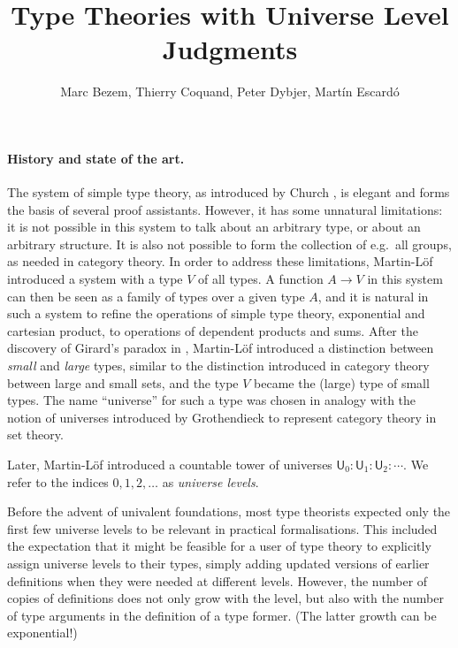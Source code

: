 \documentclass[11pt,a4paper]{article}
\theoremstyle{definition}
\def\UU{\mathsf{U}}
\begin{document}
\title{Type Theories with Universe Level Judgments}

\author{Marc Bezem, Thierry Coquand, Peter Dybjer, Mart\'in Escard\'o}
\date{}
\maketitle


\section*{}\label{sec:intros}
\newcommand{\ttt}[1]{\text{\tt #1}}

\paragraph{History and state of the art.} 
The system of simple type theory, as introduced by Church \cite{church:formulation},
is elegant and forms the basis of several proof assistants. 
However, it has some unnatural limitations: it is not possible in this system to talk
about an arbitrary type, or about an arbitrary structure. 
It is also not possible to form the collection of e.g.\ all groups, 
as needed in category theory. In order to address these limitations, 
Martin-L\"of \cite{ML71,ML71a} introduced a system with a type $V$ of all types. 
A function $A\rightarrow V$ in this system can then be seen as a family of types 
over a given type $A$, and it is natural in such a system to refine
the operations of simple type theory, exponential and cartesian product, 
to operations of dependent products and sums. 
After the discovery of Girard's paradox in \cite{Girard71}, 
Martin-L\"of \cite{ML72} introduced a distinction between
{\em small} and {\em large} types, similar to the distinction introduced 
in category theory between large and small sets,
and the type $V$ became the (large) type of small types.
The name ``universe'' for such a type was chosen in analogy with the notion of 
universes introduced by Grothendieck to represent category theory in set theory.

Later, Martin-L\"of \cite{martinlof:predicative} introduced a countable tower 
of universes $\UU_0 : \UU_1 : \UU_2 : \cdots$.
We refer to the indices $0, 1, 2, \ldots$ as {\em universe levels}. 

Before the advent of univalent foundations, most type theorists expected only the first few 
universe levels to be relevant in practical formalisations. 
This included the expectation that it might be feasible for a user of type theory to 
explicitly assign universe levels to their types, simply adding updated versions of earlier
definitions when they were needed at different levels.
However, the number of copies of definitions does not only grow with the level, 
but also with the number of type arguments in the definition of a type former. 
(The latter growth can be exponential!)
\end{document}
